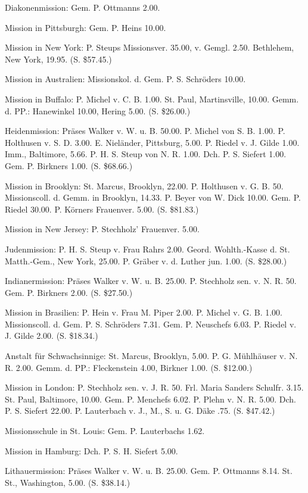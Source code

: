 Diakonenmission: Gem. P. Ottmanns 2.00.

Mission in Pittsburgh: Gem. P. Heins 10.00.

Mission in New York: P. Steups Missionsver. 35.00, v. Gemgl. 2.50. Bethlehem, New York, 19.95. (S. \$57.45.)

Mission in Australien: Missionskol. d. Gem. P. S. Schröders 10.00.

Mission in Buffalo: P. Michel v. C. B. 1.00. St. Paul, Martinsville, 10.00. Gemm. d. PP.: Hanewinkel 10.00, Hering 5.00. (S. \$26.00.)


Heidenmission: Präses Walker v. W. u. B. 50.00. P. Michel von S. B. 1.00. P. Holthusen v. S. D. 3.00. E. Nieländer, Pittsburg, 5.00. P. Riedel v. J. Gilde 1.00. Imm., Baltimore, 5.66. P. H. S. Steup von N. R. 1.00. Dch. P. S. Siefert 1.00. Gem. P. Birkners 1.00. (S. \$68.66.)

Mission in Brooklyn: St. Marcus, Brooklyn, 22.00. P. Holthusen v. G. B. 50. Missionscoll. d. Gemm. in Brooklyn, 14.33. P. Beyer von W. Dick 10.00. Gem. P. Riedel 30.00. P. Körners Frauenver. 5.00. (S. \$81.83.)

Mission in New Jersey: P. Stechholz’ Frauenver. 5.00.

Judenmission: P. H. S. Steup v. Frau Rahrs 2.00. Geord. Wohlth.-Kasse d. St. Matth.-Gem., New York, 25.00. P. Gräber v. d. Luther jun. 1.00. (S. \$28.00.)

Indianermission: Präses Walker v. W. u. B. 25.00. P. Stechholz sen. v. N. R. 50. Gem. P. Birkners 2.00. (S. \$27.50.)

Mission in Brasilien: P. Hein v. Frau M. Piper 2.00. P. Michel v. G. B. 1.00. Missionscoll. d. Gem. P. S. Schröders 7.31. Gem. P. Neuschefs 6.03. P. Riedel v. J. Gilde 2.00. (S. \$18.34.)

Anstalt für Schwachsinnige: St. Marcus, Brooklyn, 5.00. P. G. Mühlhäuser v. N. R. 2.00. Gemm. d. PP.: Fleckenstein 4.00, Birkner 1.00. (S. \$12.00.)

Mission in London: P. Stechholz sen. v. J. R. 50. Frl. Maria Sanders Schulfr. 3.15. St. Paul, Baltimore, 10.00. Gem. P. Menchefs 6.02. P. Plehn v. N. R. 5.00. Dch. P. S. Siefert 22.00. P. Lauterbach v. J., M., S. u. G. Däke .75. (S. \$47.42.)

Missionsschule in St. Louis: Gem. P. Lauterbachs 1.62.

Mission in Hamburg: Dch. P. S. H. Siefert 5.00.

Lithauermission: Präses Walker v. W. u. B. 25.00. Gem. P. Ottmanns 8.14. St. St., Washington, 5.00. (S. \$38.14.)

